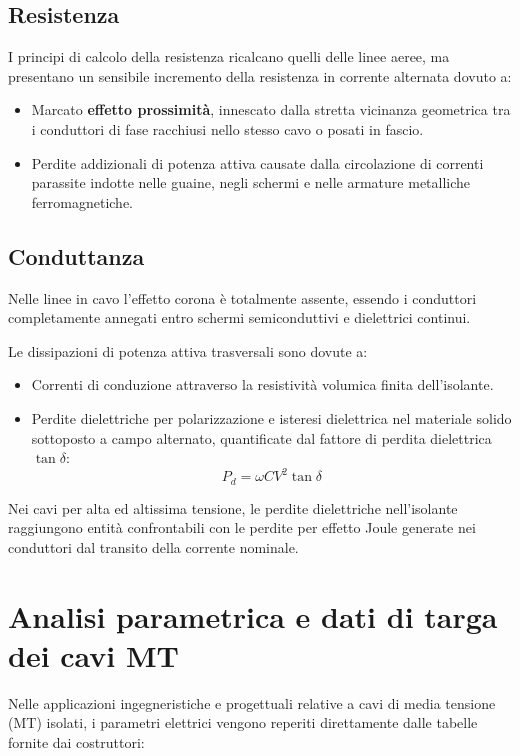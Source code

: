 \subsection{Resistenza}
I principi di calcolo della resistenza ricalcano quelli delle linee aeree, ma presentano un sensibile incremento della resistenza in corrente alternata dovuto a:
\begin{itemize}
    \item Marcato \textbf{effetto prossimità}, innescato dalla stretta vicinanza geometrica tra i conduttori di fase racchiusi nello stesso cavo o posati in fascio.
    \item Perdite addizionali di potenza attiva causate dalla circolazione di correnti parassite indotte nelle guaine, negli schermi e nelle armature metalliche ferromagnetiche.
\end{itemize}

\subsection{Conduttanza}
Nelle linee in cavo l'effetto corona è totalmente assente, essendo i conduttori completamente annegati entro schermi semiconduttivi e dielettrici continui. 

Le dissipazioni di potenza attiva trasversali sono dovute a:
\begin{itemize}
    \item Correnti di conduzione attraverso la resistività volumica finita dell'isolante.
    \item Perdite dielettriche per polarizzazione e isteresi dielettrica nel materiale solido sottoposto a campo alternato, quantificate dal fattore di perdita dielettrica $\tan\delta$:
    \[P_d = \omega C V^2 \tan\delta\]
\end{itemize}
Nei cavi per alta ed altissima tensione, le perdite dielettriche nell'isolante raggiungono entità confrontabili con le perdite per effetto Joule generate nei conduttori dal transito della corrente nominale.

\section{Analisi parametrica e dati di targa dei cavi MT}
Nelle applicazioni ingegneristiche e progettuali relative a cavi di media tensione (MT) isolati, i parametri elettrici vengono reperiti direttamente dalle tabelle fornite dai costruttori:

